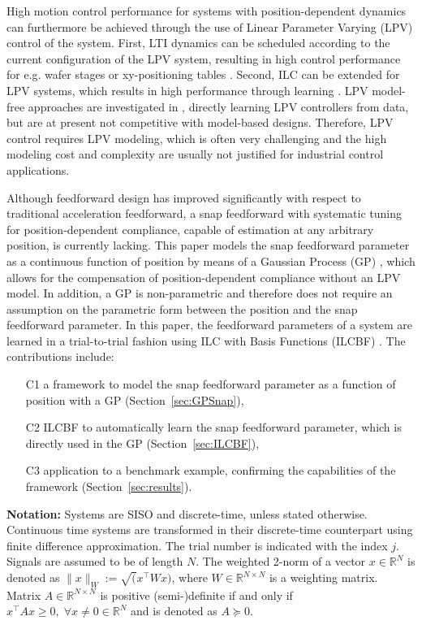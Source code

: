 \documentclass[letterpaper, 10 pt, conference]{ieeeconf}  %
\newcounter{assumption}
\newcounter{example}
\begin{document}
High motion control performance for systems with position-dependent dynamics can furthermore be achieved through the use of Linear Parameter Varying (LPV) control of the system. First, LTI dynamics can be scheduled according to the current configuration of the LPV system, resulting in high control performance for e.g. wafer stages \cite{deRozario2017b,Wassink2005} or xy-positioning tables \cite{Toth2011}. Second, ILC can be extended for LPV systems, which results in high performance through learning \cite{deRozario2017}. LPV model-free approaches are investigated in \cite{Formentin2016}, directly learning LPV controllers from data, but are at present not competitive with model-based designs. Therefore, LPV control requires LPV modeling, which is often very challenging and the high modeling cost and complexity are usually not justified for industrial control applications.\par
Although feedforward design has improved significantly with respect to traditional acceleration feedforward, a snap feedforward with systematic tuning for position-dependent compliance, capable of estimation at any arbitrary position, is currently lacking. This paper models the snap feedforward parameter as a continuous function of position by means of a Gaussian Process (GP) \cite{Rasmussen2004,Pillonetto2014}, which allows for the compensation of position-dependent compliance without an LPV model. In addition, a GP is non-parametric and therefore does not require an assumption on the parametric form between the position and the snap feedforward parameter. In this paper, the feedforward parameters of a system are learned in a trial-to-trial fashion using ILC with Basis Functions (ILCBF) \cite{vandeWijdeven2010}. The contributions include:
\begin{enumerate}
	\item[C1] a framework to model the snap feedforward parameter as a function of position with a GP (Section~\ref{sec:GPSnap}),
	\item[C2] ILCBF to automatically learn the snap feedforward parameter, which is directly used in the GP (Section~\ref{sec:ILCBF}),
	\item[C3] application to a benchmark example, confirming the capabilities of the framework (Section~\ref{sec:results}).
\end{enumerate}
\hfill\par
\textbf{Notation:} Systems are SISO and discrete-time, unless stated otherwise. Continuous time systems are transformed in their discrete-time counterpart using finite difference approximation. The trial number is indicated with the index $j$. Signals are assumed to be of length $N$. The weighted 2-norm of a vector $x \in \mathbb{R}^N$ is denoted as $\| x \|_W := \sqrt(x^\top W x)$, where $W \in \mathbb{R}^{N\times N}$ is a weighting matrix. Matrix $A\in\mathbb{R}^{N\times N}$ is positive (semi-)definite if and only if $x^\top A x \geq 0, \; \forall x \neq 0 \in \mathbb{R}^N$ and is denoted as $A\succeq 0$.
\end{document}
